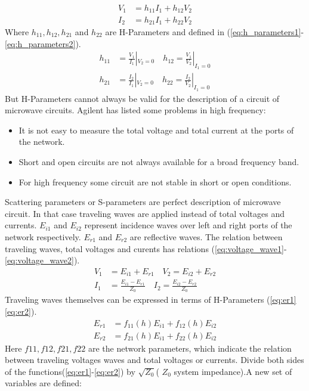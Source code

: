 \begin{align}
V_{1}&=h_{11}I_{1}+h_{12}V_{2}\\
I_{2}&=h_{21}I_{1}+h_{22}V_{2}
\label{eq:voltage_current}
\end{align}
Where $h_{11},h_{12},h_{21}$ and $h_{22}$ are H-Parameters and defined in (\ref{eq:h_parameters1}-\ref{eq:h_parameters2}).
\begin{align}
h_{11}&=\frac{V_{1}}{I_{1}}|_{V_{2}=0}\quad h_{12}=\frac{V_{1}}{V_{2}}|_{I_{1}=0}
\label{eq:h_parameters1}\\
h_{21}&=\frac{I_{2}}{I_{1}}|_{V_{2}=0}\quad h_{22}=\frac{I_{2}}{V_{2}}|_{I_{1}=0}
\label{eq:h_parameters2}
\end{align}
But H-Parameters cannot always be valid for the description of a circuit of microwave circuits. Agilent\cite{aglient_s_parameters} has listed some problems in high frequency:
\begin{itemize}
\item It is not easy to measure the total voltage and total current at the ports of the network.
\item Short and open circuits are not always available for a broad frequency band.
\item For high frequency some circuit are not stable in short or open conditions.
\end{itemize}
Scattering parameters or S-parameters are perfect description of microwave circuit\cite{RF194_s_parameters}. In that case traveling waves are applied instead of total voltages and currents. $E_{i1}$ and $E_{i2}$ represent incidence waves over left and right ports of the network respectively. $E_{r1}$ and $E_{r2}$ are reflective waves. The relation between traveling waves, total voltages and curents has relations (\ref{eq:voltage_wave1}-\ref{eq:voltage_wave2}).
\begin{align}
V_{1}&=E_{i1}+E_{r1}\quad V_{2}=E_{i2}+E_{r2}
\label{eq:voltage_wave1}\\
I_{1}&=\frac{E_{i1}-E_{r1}}{Z_{0}}\quad I_{2}=\frac{E_{i2}-E_{r2}}{Z_{0}}
\label{eq:voltage_wave2}
\end{align}
Traveling waves themselves can be expressed in terms of H-Parameters (\ref{eq:er1}\ref{eq:er2}). 
\begin{align}
E_{r1}&=f_{11}(h)E_{i1}+f_{12}(h)E_{i2}
\label{eq:er1}
\\
E_{r2}&=f_{21}(h)E_{i1}+f_{22}(h)E_{i2}
\label{eq:er2}
\end{align}
Here $f11, f12, f21, f22$ are the network parameters, which indicate the relation between traveling voltages waves and total voltages or currents. Divide both sides of the functions(\ref{eq:er1}-\ref{eq:er2}) by $\sqrt{Z_{0}}$( $Z_{0}$ system impedance).A new set of variables are defined:
